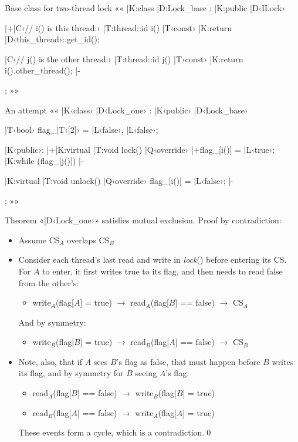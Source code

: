\documentclass{beamer}
\begin{document}
\begin{frame}[fragile]{Base class for two-thread lock}{}
  ««
  |K:class |D:Lock_base : |K:public |D‹ILock›
  {
  	|+|C‹// i() is this thread:›
    |T:thread::id i() |T‹const›
    {
    	|K:return |D‹this_thread›::get_id();
    }

    |C‹// j() is the other thread:›
    |T:thread::id j() |T‹const›
    {
    	|K:return i().other_thread();
    } |-
  };
  »»
\end{frame}

\begin{frame}[fragile]{An attempt}{}
  ««
  |K‹class› |D‹Lock_one› : |K‹public› |D‹Lock_base›
  {
  	|T‹bool› flag_|T‹[2]› = {|L‹false›, |L‹false›};

  |K‹public›:
  	|+|K:virtual |T:void lock() |Q‹override›
    {
    	|+flag_[i()] = |L‹true›;
      |K:while (flag_[j()]) {} |-
    }

    |K:virtual |T:void unlock() |Q‹override›
    { flag_[i()] = |L‹false›; } |-
  };
  »»
\end{frame}

\begin{frame}[fragile]{Theorem}{}
  «|D‹Lock_one›» satisfies mutual exclusion.
  \pause \alert{Proof by contradiction:}

  \begin{itemize}
    \item Assume CS$_A$ overlaps CS$_B$
    \pause
    \item Consider each thread’s last read and write in \emph{lock}() before
      entering its CS. For $A$ to enter, it first writes true to its flag,
      and then needs to read false from the other’s:
      \begin{itemize}
        \item write$_A$(flag[$A$] = true) $\to$ read$_A$(flag[$B$] == false) $\to$ CS$_A$
      \end{itemize}
      \pause
      And by symmetry:
      \begin{itemize}
        \item write$_B$(flag[$B$] = true) $\to$ read$_B$(flag[$A$] == false) $\to$ CS$_B$
      \end{itemize}
    \pause
    \item Note, also, that if $A$ sees $B$’s flag as false, that must happen
      before $B$ writes its flag, and by symmetry for $B$ seeing $A$’s flag:
      \begin{itemize}
        \item read$_A$(flag[$B$] == false) $\to$ write$_B$(flag[$B$] = true)
        \item read$_B$(flag[$A$] == false) $\to$ write$_A$(flag[$A$] = true)
      \end{itemize}
      \pause
      These events form a cycle, which is a contradiction.\hfill\qed
  \end{itemize}
\end{frame}
\end{document}
